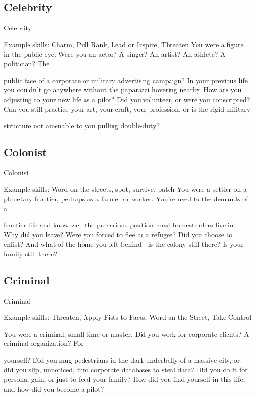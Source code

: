                                                                                                                 

\subsection{Celebrity}
                                                    Celebrity  

Example skills: Charm, Pull Rank, Lead or Inspire, Threaten  
You were a figure in the public eye. Were you an actor? A singer? An artist? An athlete? A politician? The  

public face of a corporate or military advertising campaign? In your previous life you couldn’t go anywhere  
without the paparazzi hovering nearby. How are you adjusting to your new life as a pilot? Did you volunteer,  
or were you conscripted? Can you still practice your art, your craft, your profession, or is the rigid military  

structure not amenable to you pulling double-duty?   
\subsection{Colonist}
                                                    Colonist  

Example skills: Word on the streets, spot, survive, patch  
You were a settler on a planetary frontier, perhaps as a farmer or worker. You’re used to the demands of a  

frontier life and know well the precarious position most homesteaders live in. Why did you leave? Were you  
forced to flee as a refugee? Did you choose to enlist? And what of the home you left behind - is the colony  
still there? Is your family still there?   
\subsection{Criminal}
                                                    Criminal  

Example skills: Threaten, Apply Fists to Faces, Word on the Street, Take Control  

You were a criminal, small time or master. Did you work for corporate clients? A criminal organization? For  

yourself? Did you mug pedestrians in the dark underbelly of a massive city, or did you slip, unnoticed, into  
corporate databases to steal data? Did you do it for personal gain, or just to feed your family? How did you  
find yourself in this life, and how did you become a pilot?
 
